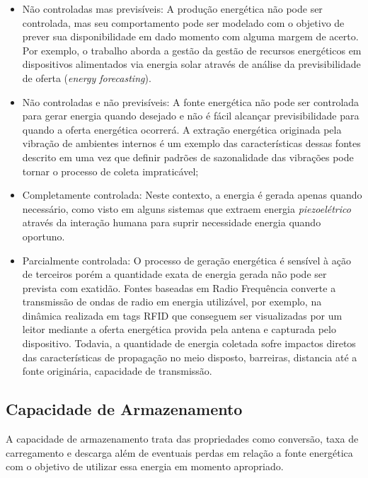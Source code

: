 \begin{itemize}

    \item Não controladas mas previsíveis: A produção energética não pode ser controlada, mas seu comportamento pode ser modelado com o objetivo de prever sua disponibilidade em dado momento com alguma margem de acerto. Por exemplo, o trabalho  \cite{lee_energy_2018} aborda a gestão da gestão de recursos energéticos em dispositivos alimentados via energia solar através de análise da previsibilidade de oferta (\textit{energy forecasting}).
    
    
    \item Não controladas e não previsíveis: A fonte energética não pode ser controlada para gerar energia quando desejado e não é fácil alcançar previsibilidade para quando a oferta energética ocorrerá. A extração energética originada pela vibração de ambientes internos é um exemplo das características dessas fontes descrito em \cite{wei_comprehensive_2017} uma vez que definir padrões de sazonalidade das vibrações pode tornar o processo de coleta impraticável;
    
    \item Completamente controlada: Neste contexto, a energia é gerada apenas quando necessário, como visto em alguns sistemas que extraem energia \textit{piezoelétrico} através da interação humana para suprir necessidade energia quando oportuno.
    
    \item Parcialmente controlada: O processo de geração energética é sensível à ação de terceiros porém a quantidade exata de energia gerada não pode ser prevista com exatidão. Fontes baseadas em Radio Frequência converte a transmissão de ondas de radio em energia utilizável, por exemplo, na dinâmica realizada em tags \acf{RFID} que conseguem ser visualizadas por um leitor mediante a oferta energética provida pela antena e capturada pelo dispositivo. Todavia, a quantidade de energia coletada sofre impactos diretos das características de propagação no meio disposto, barreiras, distancia até a fonte originária, capacidade de transmissão.
\end{itemize}

\subsection{Capacidade de Armazenamento}
\label{Capacidade de Armazenamento}
A capacidade de armazenamento trata das propriedades como conversão, taxa de carregamento e descarga além de eventuais perdas em relação a fonte energética com o objetivo de utilizar essa energia em momento apropriado. 

